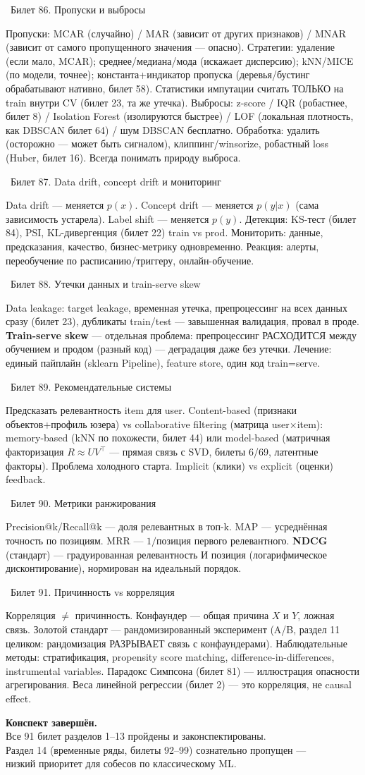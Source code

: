 \documentclass[12pt, a4paper]{article}
\newcommand{\bilet}[2]{%
  \vspace{10pt}%
  \noindent\colorbox{qcolor}{\parbox{\dimexpr\linewidth-2\fboxsep\relax}{%
    \color{white}\large\bfseries\strut\ Билет #1. #2%
  }}%
  \nopagebreak\vspace{5pt}\par\nopagebreak%
}
\begin{document}
\bilet{86}{Пропуски и выбросы}
Пропуски: MCAR (случайно) / MAR (зависит от других признаков) / MNAR (зависит от самого пропущенного значения --- опасно). Стратегии: удаление (если мало, MCAR); среднее/медиана/мода (искажает дисперсию); kNN/MICE (по модели, точнее); константа+индикатор пропуска (деревья/бустинг обрабатывают нативно, билет 58). Статистики импутации считать ТОЛЬКО на train внутри CV (билет 23, та же утечка). Выбросы: z-score / IQR (робастнее, билет 8) / Isolation Forest (изолируются быстрее) / LOF (локальная плотность, как DBSCAN билет 64) / шум DBSCAN бесплатно. Обработка: удалить (осторожно --- может быть сигналом), клиппинг/winsorize, робастный loss (Huber, билет 16). Всегда понимать природу выброса.

\bilet{87}{Data drift, concept drift и мониторинг}
Data drift --- меняется $p(x)$. Concept drift --- меняется $p(y|x)$ (сама зависимость устарела). Label shift --- меняется $p(y)$. Детекция: KS-тест (билет 84), PSI, KL-дивергенция (билет 22) train vs prod. Мониторить: данные, предсказания, качество, бизнес-метрику одновременно. Реакция: алерты, переобучение по расписанию/триггеру, онлайн-обучение.

\bilet{88}{Утечки данных и train-serve skew}
Data leakage: target leakage, временная утечка, препроцессинг на всех данных сразу (билет 23), дубликаты train/test --- завышенная валидация, провал в проде. \textbf{Train-serve skew} --- отдельная проблема: препроцессинг РАСХОДИТСЯ между обучением и продом (разный код) --- деградация даже без утечки. Лечение: единый пайплайн (sklearn Pipeline), feature store, один код train=serve.

\bilet{89}{Рекомендательные системы}
Предсказать релевантность item для user. Content-based (признаки объектов+профиль юзера) vs collaborative filtering (матрица user$\times$item): memory-based (kNN по похожести, билет 44) или model-based (матричная факторизация $R\approx UV^\top$ --- прямая связь с SVD, билеты 6/69, латентные факторы). Проблема холодного старта. Implicit (клики) vs explicit (оценки) feedback.

\bilet{90}{Метрики ранжирования}
Precision@k/Recall@k --- доля релевантных в топ-k. MAP --- усреднённая точность по позициям. MRR --- $1/$позиция первого релевантного. \textbf{NDCG} (стандарт) --- градуированная релевантность И позиция (логарифмическое дисконтирование), нормирован на идеальный порядок.

\bilet{91}{Причинность vs корреляция}
Корреляция $\ne$ причинность. Конфаундер --- общая причина $X$ и $Y$, ложная связь. Золотой стандарт --- рандомизированный эксперимент (A/B, раздел 11 целиком: рандомизация РАЗРЫВАЕТ связь с конфаундерами). Наблюдательные методы: стратификация, propensity score matching, difference-in-differences, instrumental variables. Парадокс Симпсона (билет 81) --- иллюстрация опасности агрегирования. Веса линейной регрессии (билет 2) --- это корреляция, не causal effect.

\vspace{1.5cm}
\begin{center}
\large\textbf{Конспект завершён.}\\[0.3cm]
\normalsize\color{gray}
Все 91 билет разделов 1--13 пройдены и законспектированы.\\
Раздел 14 (временные ряды, билеты 92--99) сознательно пропущен ---\\
низкий приоритет для собесов по классическому ML.
\end{center}
\end{document}
